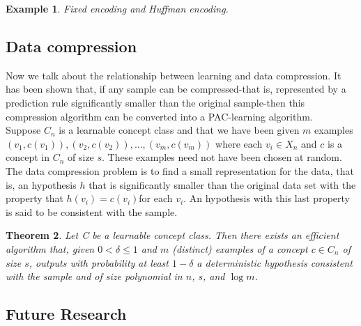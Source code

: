 \documentclass[12pt]{article}
\newtheorem{theorem}{Theorem}
\newtheorem{example}[theorem]{Example}
\begin{document}
\begin{example}
Fixed encoding and Huffman encoding.
\end{example}

\subsection{Data compression}

Now we talk about the relationship between learning and data
compression. It has been shown that, if any sample can be
compressed-that is, represented by a prediction rule significantly
smaller than the original sample-then this compression algorithm can be
converted into a PAC-learning algorithm. \\

Suppose $C_n$ is a learnable concept class and that we have been given
$m$ examples $(v_1, c(v_1)), (v_2, c(v_2)),..., (v_m, c(v_m))$ where
each $v_i \in X_n$ and $c$ is a concept in $C_n$ of size $s$. These
examples need not have been chosen at random. The data compression
problem is to find a small representation for the data, that is, an
hypothesis $h$ that is significantly smaller than the original data
set with the property that $h(v_i) = c(v_i)$for each $v_i$. An
hypothesis with this last property is said to be consistent with the
sample.

\begin{theorem}
Let C be a learnable concept class. Then there exists an efficient
algorithm that, given $0 < \delta \le 1$ and $m$ (distinct) examples
of a concept $c \in C_n$ of size $s$, outputs with probability at
least $1 - \delta$ a deterministic hypothesis consistent with the
sample and of size polynomial in $n$, $s$, and $\log m$.
\end{theorem}

\subsection{Future Research}
\end{document}
